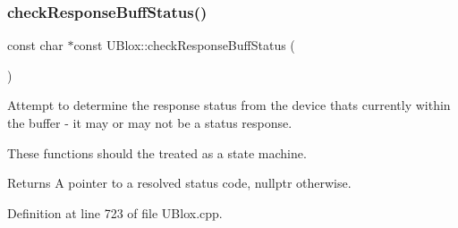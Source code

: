 \subsubsection{\texorpdfstring{check\+Response\+Buff\+Status()}{checkResponseBuffStatus()}}
{\footnotesize\ttfamily const char $\ast$const U\+Blox\+::check\+Response\+Buff\+Status (\begin{DoxyParamCaption}{ }\end{DoxyParamCaption})\hspace{0.3cm}{\ttfamily [private]}}

Attempt to determine the response status from the device that\textquotesingle{}s currently within the buffer -\/ it may or may not be a status response.

These functions should the treated as a state machine.

\begin{DoxyReturn}{Returns}
A pointer to a resolved status code, nullptr otherwise. 
\end{DoxyReturn}


Definition at line 723 of file U\+Blox.\+cpp.


